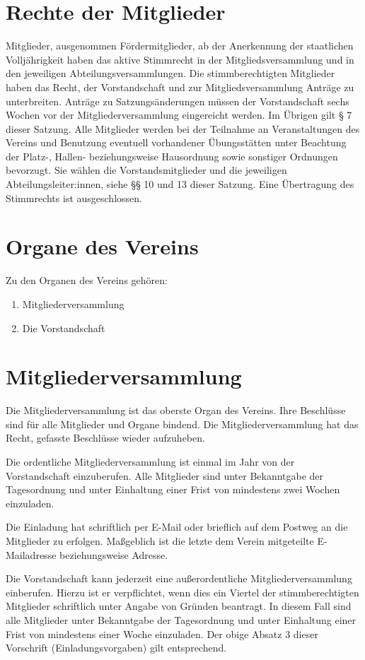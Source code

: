 \documentclass[10pt,a4paper]{article}
\begin{document}
\section{Rechte der Mitglieder}
Mitglieder, ausgenommen Fördermitglieder, ab der Anerkennung der staatlichen Volljährigkeit haben das aktive
Stimmrecht in der Mitgliedsversammlung und in den jeweiligen Abteilungsversammlungen.
Die stimmberechtigten Mitglieder haben das Recht, der Vorstandschaft und zur Mitgliedsversammlung Anträge
zu unterbreiten. Anträge zu Satzungsänderungen müssen der Vorstandschaft sechs Wochen vor der
Mitgliederversammlung eingereicht werden. Im Übrigen gilt § 7 dieser Satzung.
Alle Mitglieder werden bei der Teilnahme an Veranstaltungen des Vereins und Benutzung eventuell vorhandener
Übungsstätten unter Beachtung der Platz-, Hallen- beziehungsweise Hausordnung sowie sonstiger Ordnungen
bevorzugt.
Sie wählen die Vorstandsmitglieder und die jeweiligen Abteilungsleiter:innen, siehe §§ 10 und 13 dieser
Satzung. Eine Übertragung des Stimmrechts ist ausgeschlossen.
\section{Organe des Vereins}
Zu den Organen des Vereins gehören:
\begin{enumerate}
\item
Mitgliederversammlung
\item
Die Vorstandschaft
\end{enumerate}

\section{Mitgliederversammlung}
Die Mitgliederversammlung ist das oberste Organ des Vereins. Ihre Beschlüsse sind für alle Mitglieder und
Organe bindend. Die Mitgliederversammlung hat das Recht, gefasste Beschlüsse wieder aufzuheben.


Die ordentliche Mitgliederversammlung ist einmal im Jahr von der Vorstandschaft einzuberufen. Alle Mitglieder
sind unter Bekanntgabe der Tagesordnung und unter Einhaltung einer Frist von mindestens zwei Wochen
einzuladen.


Die Einladung hat schriftlich per E-Mail oder brieflich auf dem Postweg an die Mitglieder zu erfolgen.
Maßgeblich ist die letzte dem Verein mitgeteilte E-Mailadresse beziehungsweise Adresse.


Die Vorstandschaft kann jederzeit eine außerordentliche Mitgliederversammlung einberufen. Hierzu ist er
verpflichtet, wenn dies ein Viertel der stimmberechtigten Mitglieder schriftlich unter Angabe von Gründen
beantragt. In diesem Fall sind alle Mitglieder unter Bekanntgabe der Tagesordnung und unter Einhaltung einer
Frist von mindestens einer Woche einzuladen. Der obige Absatz 3 dieser Vorschrift (Einladungsvorgaben) gilt
entsprechend.
\end{document}
